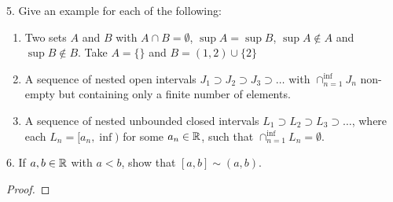 5. Give an example for each of the following: 
\begin{enumerate}
	\item Two sets $A$ and $B$ with $A \cap B = \emptyset$, $\sup A = \sup B$, $\sup A \not\in A$ and $\sup B \not\in B$.
		Take $A = \{\}$  and  $B = \left( 1, 2 \right) \cup \{2\} $	
	\item A sequence of nested open intervals $J_1 \supset J_2 \supset J_3 \supset \ldots$ with $\cap_{n=1}^{\inf}J_n$ non-empty but containing only a finite number of elements.
	\item A sequence of nested unbounded closed intervals $L_1 \supset L_2 \supset L_3 \supset \ldots$, where each $L_n = [a_n, \inf)$ for some $a_n \in \mathbb{R}$, such that $\cap_{n=1}^{\inf}L_n = \emptyset$.
\end{enumerate}





6. If $a, b \in \mathbb{R}$ with $a < b$, show that $[a, b] \sim \left( a, b \right) $.

\begin{proof}
	
\end{proof}























